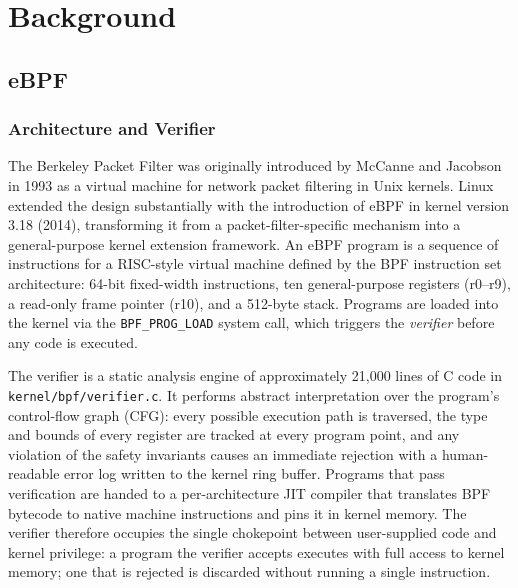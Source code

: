 \chapter{Background}
\label{ch:background}

\section{eBPF}
\label{sec:ebpf}

\subsection{Architecture and Verifier}
\label{sec:ebpf-arch}

The Berkeley Packet Filter was originally introduced by McCanne and Jacobson in
1993 as a virtual machine for network packet filtering in Unix kernels.
Linux extended the design substantially with the introduction of eBPF in kernel
version 3.18 (2014), transforming it from a packet-filter-specific mechanism into
a general-purpose kernel extension framework.
An eBPF program is a sequence of instructions for a RISC-style virtual machine
defined by the BPF instruction set architecture: 64-bit fixed-width instructions,
ten general-purpose registers (r0--r9), a read-only frame pointer (r10), and a
512-byte stack.
Programs are loaded into the kernel via the \texttt{BPF\_PROG\_LOAD} system call,
which triggers the \emph{verifier} before any code is executed.

The verifier is a static analysis engine of approximately 21,000 lines of C code
in \texttt{kernel/bpf/verifier.c}.
It performs abstract interpretation over the program's control-flow graph (CFG):
every possible execution path is traversed, the type and bounds of every register
are tracked at every program point, and any violation of the safety invariants
causes an immediate rejection with a human-readable error log written to the kernel
ring buffer.
Programs that pass verification are handed to a per-architecture JIT compiler
that translates BPF bytecode to native machine instructions and pins it in kernel
memory.
The verifier therefore occupies the single chokepoint between user-supplied code
and kernel privilege: a program the verifier accepts executes with full access to
kernel memory; one that is rejected is discarded without running a single
instruction.

